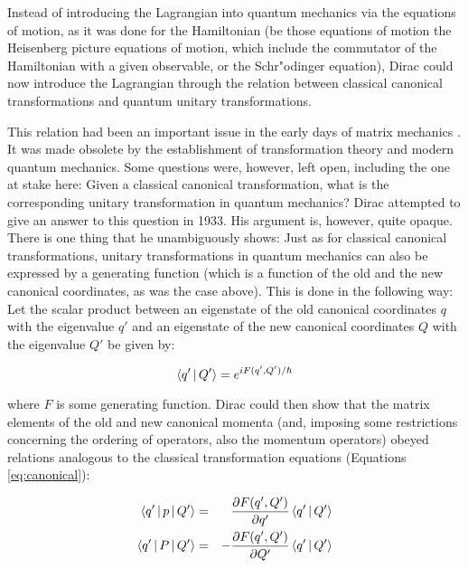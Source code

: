 \documentclass[12pt,a4paper]{article}
\begin{document}
Instead of introducing the Lagrangian into quantum mechanics via the equations of motion, as it was done for the Hamiltonian (be those equations of motion the Heisenberg picture equations of motion, which include the commutator of the Hamiltonian with a given observable, or the Schr"odinger equation), Dirac could now introduce the Lagrangian through the relation between classical canonical transformations and quantum unitary transformations. 

This relation had been an important issue in the early days of matrix mechanics \citep{lacki_2004_the-puzzle}. It was made obsolete by the establishment of transformation theory and modern quantum mechanics. Some questions were, however, left open, including the one at stake here: Given a classical canonical transformation, what is the corresponding unitary transformation in quantum mechanics? Dirac attempted to give an answer to this question in 1933. His argument is, however, quite opaque. There is one thing that he unambiguously shows: Just as for classical canonical transformations, unitary transformations in quantum mechanics can also be expressed by a generating function (which is a function of the old and the new canonical coordinates, as was the case above). This is done in the following way: Let the scalar product between an eigenstate of the old canonical coordinates $q$ with the eigenvalue $q'$ and an eigenstate of the new canonical coordinates $Q$ with the eigenvalue $Q'$ be given by:

\begin{equation}
\Braket{q' | Q' } = e^{i F(q', Q') / \hbar}
\end{equation}

where $F$ is some generating function. Dirac could then show that the matrix elements of the old and new canonical momenta (and, imposing some restrictions concerning the ordering of operators, also the momentum operators) obeyed relations analogous to the classical transformation equations (Equations \ref{eq:canonical}):

\begin{eqnarray}
\Braket{q' | p | Q' } & = & \frac{\partial F(q',Q')}{\partial q'}  \Braket{q' | Q' }\nonumber\\
\Braket{q' |P | Q' } & = & - \frac{\partial F(q',Q')}{\partial Q'} \Braket{q' | Q' }
\end{eqnarray}
\end{document}
